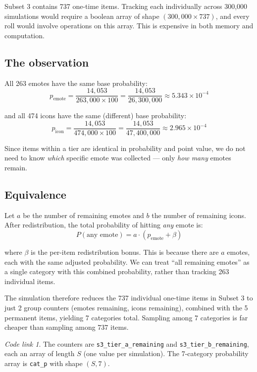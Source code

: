 \documentclass[11pt,a4paper]{article}
\theoremstyle{remark}
\newtheorem*{codelink}{Code link}
\begin{document}
Subset 3 contains 737 one-time items. Tracking each individually across 300{,}000 simulations would require a boolean array of shape $(300{,}000 \times 737)$, and every roll would involve operations on this array. This is expensive in both memory and computation.

\subsection{The observation}

All 263 emotes have the same base probability:
\[
p_{\text{emote}} = \frac{14{,}053}{263{,}000 \times 100} = \frac{14{,}053}{26{,}300{,}000} \approx 5.343 \times 10^{-4}
\]

and all 474 icons have the same (different) base probability:
\[
p_{\text{icon}} = \frac{14{,}053}{474{,}000 \times 100} = \frac{14{,}053}{47{,}400{,}000} \approx 2.965 \times 10^{-4}
\]

Since items within a tier are identical in probability and point value, we do not need to know \emph{which} specific emote was collected --- only \emph{how many} emotes remain.

\subsection{Equivalence}

Let $a$ be the number of remaining emotes and $b$ the number of remaining icons. After redistribution, the total probability of hitting \emph{any} emote is:
\[
P(\text{any emote}) = a \cdot (p_{\text{emote}} + \beta)
\]

where $\beta$ is the per-item redistribution bonus. This is because there are $a$ emotes, each with the same adjusted probability. We can treat ``all remaining emotes'' as a single category with this combined probability, rather than tracking 263 individual items.

The simulation therefore reduces the 737 individual one-time items in Subset 3 to just 2 group counters (emotes remaining, icons remaining), combined with the 5 permanent items, yielding 7 categories total. Sampling among 7 categories is far cheaper than sampling among 737 items.

\begin{codelink}
The counters are \texttt{s3\_tier\_a\_remaining} and \texttt{s3\_tier\_b\_remaining}, each an array of length $S$ (one value per simulation). The 7-category probability array is \texttt{cat\_p} with shape $(S, 7)$.
\end{codelink}
\end{document}
